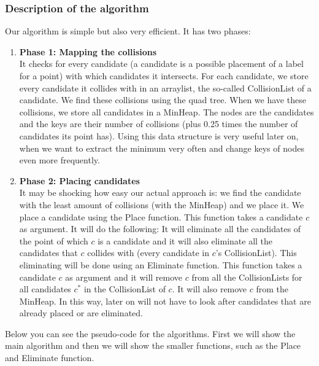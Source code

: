 \documentclass[crop=false,a4paper,oneside,11pt]{article}
\begin{document}
\subsubsection{Description of the algorithm}
Our algorithm is simple but also very efficient. It has two phases:
\begin{enumerate}
\item \textbf{Phase 1: Mapping the collisions}\\
It checks for every candidate (a candidate is a possible placement of a label for a point) with which candidates it intersects. For each candidate, we store every candidate it collides with in an arraylist, the so-called CollisionList of a candidate. We find these collisions using the quad tree. When we have these collisions, we store all candidates in a MinHeap. The nodes are the candidates and the keys are their number of collisions (plus 0.25 times the number of candidates its point has). Using this data structure is very useful later on, when we want to extract the minimum very often and change keys of nodes even more frequently.
\item \textbf{Phase 2: Placing candidates}\\
It may be shocking how easy our actual approach is: we find the candidate with the least amount of collisions (with the MinHeap) and we place it. We place a candidate using the Place function. This function takes a candidate $c$ as argument. It will do the following: It will eliminate all the candidates of the point of which $c$ is a candidate and it will also eliminate all the candidates that $c$ collides with (every candidate in $c$'s CollisionList). This eliminating will be done using an Eliminate function. This function takes a candidate $c$ as argument and it will remove $c$ from all the CollisionLists for all candidates $c^*$ in the CollisionList of $c$. It will also remove $c$ from the MinHeap. In this way, later on will not have to look after candidates that are already placed or are eliminated. 
\end{enumerate}
Below you can see the pseudo-code for the algorithms. First we will show the main algorithm and then we will show the smaller functions, such as the Place and Eliminate function.
\end{document}
